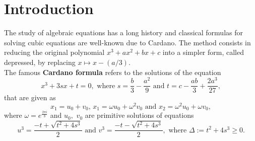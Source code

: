 \documentclass[11pt,reqno]{amsart}
\begin{document}
\section{Introduction} The study of algebraic equations has a long history and classical formulas for solving cubic  equations are well-known due to 
 Cardano\cite{Katz2009}. The method  consists in reducing the original polynomial $x^3+ax^2+bx+c$ into a simpler form, called depressed, by replacing $x\mapsto x-(a/3)$. %
 \\The famous \textbf{Cardano formula} refers to the solutions of the equation \begin{equation}\label{Cardano}
     x^3+3sx+t=0, \text{ where }  s=\frac{b}{3}-\frac{a^2}{9} \text{ and }t=c-\frac{ab}{3}+\frac{2a^3}{27}, 
 \end{equation}  
 that are given as
 \begin{equation}
     x_1=u_0+v_0,\, x_1=\omega u_0+\omega^2v_0 \text{ and }
     x_2=\omega^2u_0+\omega v_0,
 \end{equation}
 where $\omega=e^{\frac{2\pi i}{3}}$ and $u_0,$ $v_0$ are primitive solutions of equations
\begin{equation}
    u^3=\frac{-t+\sqrt{t^2+4s^3}}{2} \text{ and } v^3=\frac{-t-\sqrt{t^2+4s^3}}{2}, \text{ where } \Delta:= t^2+4s^3\geq 0.
\end{equation}
\end{document}
